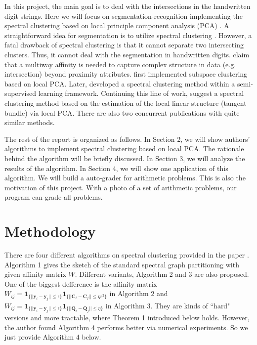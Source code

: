 In this project, the main goal is to deal with the intersections in the handwritten digit strings.
Here we will focus on segmentation-recognition implementing the spectral clustering based on local principle component analysis (PCA) \citep{arias2017}.
A straightforward idea for segmentation is to utilize spectral clustering \citep{ng2002}.
However, a fatal drawback of spectral clustering is that it cannot separate two intersecting clusters.
Thus, it cannot deal with the segmentation in handwritten digits.
\citet{shashua2006} claim that a multiway affinity is needed to capture complex structure in data (e.g. intersection) beyond proximity attributes.
\citet{fan2006} first implemented subspace clustering based on local PCA.
Later, \citet{goldberg2009} developed a spectral clustering method within a semi-supervised learning framework.
Continuing this line of work, \citep{arias2011} suggest a spectral clustering method based on the estimation of the local linear structure (tangent bundle) via local PCA.
There are also two concurrent publications \citep{wang2011, gong2012} with quite similar methods.

The rest of the report is organized as follows.
In Section 2, we will show authors' algorithms to implement spectral clustering based on local PCA.
The rationale behind the algorithm will be briefly discussed.
In Section 3, we will analyze the results of the algorithm.
In Section 4, we will show one application of this algorithm.
We will build a auto-grader for arithmetic problems.
This is also the motivation of this project.
With a photo of a set of arithmetic problems, our program can grade all problems.  

\section{Methodology}

There are four different algorithms on spectral clustering provided in the paper \citep{arias2017}.
Algorithm 1 gives the sketch of the standard spectral graph partitioning with given affinity matrix \(W\).
Different variants, Algorithm 2 and 3 are also proposed.
One of the biggest defference is the affinity matrix 
$W_{ij} = \boldsymbol{1}_{ \{ || \boldsymbol{y}_i - \boldsymbol{y}_j || \leq \epsilon \} } 
 \boldsymbol{1}_{ \{ || \boldsymbol{C}_i - \boldsymbol{C}_j || \leq \eta r^2 \}}  $ in Algorithm 2 and 
$W_{ij} = \boldsymbol{1}_{ \{ || \boldsymbol{y}_i - \boldsymbol{y}_j || \leq \epsilon \} } 
 \boldsymbol{1}_{ \{ || \boldsymbol{Q}_i - \boldsymbol{Q}_j || \leq \eta \}}  $ in Algorithm 3. 
They are kinds of ``hard" versions and more tractable, where Theorem 1 introduced below holds.
However, the author found  Algorithm 4 performs better via numerical experiments.
So we just provide Algorithm 4 below.

